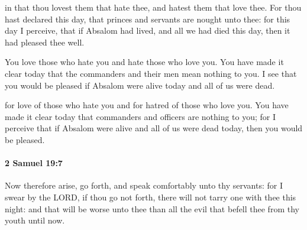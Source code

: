 			\begin{versebox}
					\item[BHS] 
					\item[ASV] in that thou lovest them that hate thee, and hatest them that love thee. For thou hast declared this day, that princes and servants are nought unto thee: for this day I perceive, that if Absalom had lived, and all we had died this day, then it had pleased thee well.
					\item[NIV] You love those who hate you and hate those who love you. You have made it clear today that the commanders and their men mean nothing to you. I see that you would be pleased if Absalom were alive today and all of us were dead.
					\item[NRSV] for love of those who hate you and for hatred of those who love you. You have made it clear today that commanders and officers are nothing to you; for I perceive that if Absalom were alive and all of us were dead today, then you would be pleased.
			\end{versebox}

		\paragraph{2 Samuel 19:7} %
			\label{2SAMUEL-19-7}

			Now therefore arise, go forth, and speak comfortably unto thy servants: for I swear by the LORD, if thou go not forth, there will not tarry one with thee this night: and that will be worse unto thee than all the evil that befell thee from thy youth until now.

